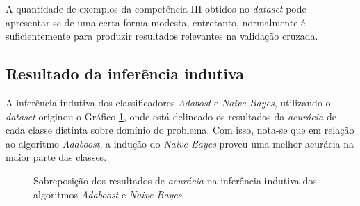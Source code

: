 A quantidade de exemplos da competência III obtidos no \textit{dataset} pode 
apresentar-se de uma certa forma modesta, entretanto, normalmente é 
suficientemente para produzir resultados relevantes na validação cruzada.

\subsection{Resultado da inferência indutiva}

A inferência indutiva dos classificadores \textit{Adabost} e 
\textit{Naive Bayes}, utilizando o \textit{dataset} originou o Gráfico 
\ref{graphic:acuracia}, onde está delineado os resultados da 
\textit{acurácia} de cada classe distinta sobre domínio do problema. Com isso, 
nota-se que em relação ao algoritmo \textit{Adaboost}, a indução do 
\textit{Naive Bayes} proveu uma melhor acurácia na maior parte das classes.

\begin{figure}[H]
    \begin{center}
    \end{center}
    \caption{Sobreposição dos resultados de \textit{acurácia} na inferência  
    indutiva dos algoritmos \textit{Adaboost} e \textit{Naive Bayes}.}
    \label{graphic:acuracia}
\end{figure}

